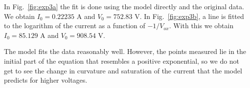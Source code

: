 In Fig.~\ref{fig:exp3a} the fit is done using the model directly and the original data. We obtain $I_0=0.22235$ A and $V_{0}=752.83$ V. In Fig.~\ref{fig:exp3b}, a line is fitted to the logarithm of the current as a function of $-1/V_{ox}$. With this we obtain $I_0=85.129$ A and $V_{0}=908.54$ V.

The model fits the data reasonably well. However, the points measured lie in the initial part of the equation that resembles a positive exponential, so we do not get to see the change in curvature and saturation of the current that the model predicts for higher voltages. 


